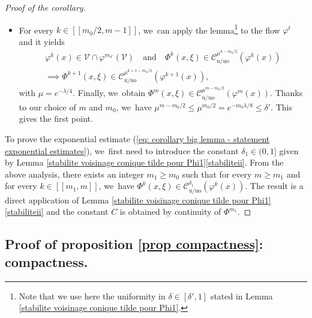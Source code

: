 \documentclass[11pt]{article}
\newcommand{\lcr}{[\![}
\newcommand{\rcr}{]\!]}
\newcommand{\rs}{\mathrm{s}}
\newcommand{\rso}{\mathrm{so}}
\newcommand{\ru}{\mathrm{u}}
\newcommand{\ruo}{\mathrm{uo}}
\theoremstyle{definition}
\theoremstyle{plain}
\newcommand{\Ccal}{\mathcal{C}}
\newcommand{\Vcal}{\mathcal{V}}
\begin{document}
\begin{proof}[Proof of the corollary]
\begin{itemize}
\[\]
then we get $\delta_{m_0/2} = 1$,
\[
\Phi^{m_0/2} (x,\xi) \notin \overline{\Ccal_{\rso/\rs}^{1} (\varphi^{m_0/2} (x))} \quad\text{and thus } \Phi^{m_0/2} (x,\xi) \in \Ccal_{\ru/\ruo}^{1} (\varphi^{m_0/2} (x)).
\]
\item For every $k\in\lcr m_0/2,m-1\rcr$, we~can apply the lemma\footnote{Note that we use here the uniformity in $\delta \in [\delta', 1]$ stated in Lemma \ref{stabilite voisinage conique tilde pour Phi1}.} to the flow $\varphi^t$ and it yields
\begin{multline*}
\varphi^k (x) \in \Vcal \cap \varphi^{m_{\delta'}} (\Vcal) \quad \text{and} \quad \Phi^k (x,\xi) \in \Ccal_{\ru/\ruo}^{\mu^{k-m_0/2}} (\varphi^k (x)) \\
\implies \Phi^{k+1}(x,\xi) \in \Ccal_{\ru/\ruo}^{\mu^{k+1-m_0/2}} (\varphi^{k+1} (x)),
\end{multline*}
with $\mu = e^{-\lambda/4}$. Finally, we~obtain
$ \Phi^{m}(x,\xi) \in \Ccal_{\ru/\ruo}^{\mu^{m - m_0/2}} (\varphi^{m} (x)).$ Thanks to our choice of $m$ and $m_0$, we~have $\mu^{m - m_0/2} \leq \mu^{m_0/2} = e^{-m_0 \lambda /8} \leq \delta'$. This gives the first point.
\end{itemize}

To prove the exponential estimate (\ref{eq: corollary big lemma - statement exponential estimates}), we~first need to introduce the constant $\delta_1\in(0,1]$ given by  Lemma \ref{stabilite voisinage conique tilde pour Phi1}\eqref{stabiliteii}. From the above analysis, there exists an integer $m_1 \geq m_0$ such that for every $m \geq m_1$ and for every $k\in\lcr m_1,m\rcr$, we~have $ \Phi^k (x,\xi) \in \Ccal_{\ru/\ruo}^{\delta_1} (\varphi^k (x))$. The result is a direct application of Lemma \ref{stabilite voisinage conique tilde pour Phi1}\eqref{stabiliteii} and the constant $C$ is obtained by continuity of $\Phi^{m_1}$.
\end{proof}

\subsection{Proof of proposition \ref{prop compactness}: compactness.}
\label{subsection: proof compactness result}
\end{document}
